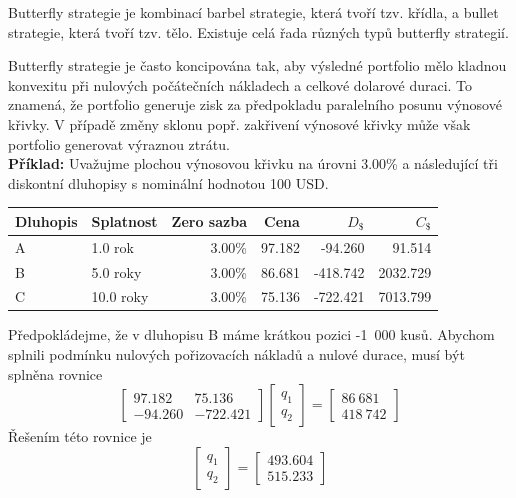 \documentclass[a4paper]{book}
\begin{document}
Butterfly strategie je kombinací barbel strategie, která tvoří tzv. křídla, a bullet strategie, která tvoří tzv. tělo. Existuje celá řada různých typů butterfly strategií.

Butterfly strategie je často koncipována tak, aby výsledné portfolio mělo kladnou konvexitu při nulových počátečních nákladech a celkové dolarové duraci. To znamená, že portfolio generuje zisk za předpokladu paralelního posunu výnosové křivky. V případě změny sklonu popř. zakřivení výnosové křivky může však portfolio generovat výraznou ztrátu.\\

\noindent \textbf{Příklad:} Uvažujme plochou výnosovou křivku na úrovni 3.00\% a následující tři diskontní dluhopisy s nominální hodnotou 100 USD.
\begin{center}
\begin{tabular}{l l r r r r}
\textbf{Dluhopis} & \textbf{Splatnost}  & \textbf{Zero sazba} & \textbf{Cena} & \textbf{$D_{\$}$} & \textbf{$C_{\$}$}\\
\hline
A      & 1.0 rok   & 3.00\% &  97.182 &  -94.260 &   91.514\\
B      & 5.0 roky  & 3.00\% &  86.681 & -418.742 & 2032.729\\
C      & 10.0 roky & 3.00\% &  75.136 & -722.421 & 7013.799
\end{tabular}
\end{center}
Předpokládejme, že v dluhopisu B máme krátkou pozici -1~000 kusů. Abychom splnili podmínku nulových pořizovacích nákladů a nulové durace, musí být splněna rovnice
\begin{equation*}
\begin{bmatrix}
97.182 & 75.136 \\
-94.260 & -722.421
\end{bmatrix}
\begin{bmatrix}
q_1 \\
q_2
\end{bmatrix}
=
\begin{bmatrix}
86~681 \\
418~742
\end{bmatrix}
\end{equation*}
Řešením této rovnice je
\begin{equation*}
\begin{bmatrix}
q_1 \\
q_2
\end{bmatrix}
=
\begin{bmatrix}
493.604 \\
515.233
\end{bmatrix}
\end{equation*}
\end{document}
